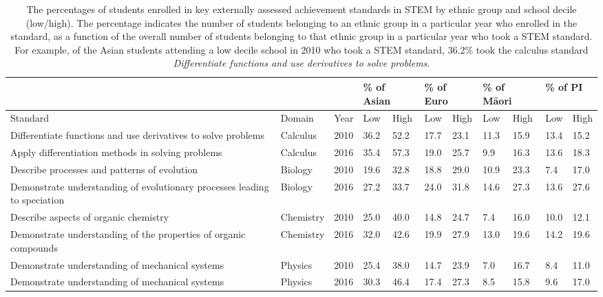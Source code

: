 \documentclass[a4paper]{article}
\begin{document}
\begin{landscape}
\begin{table}[h]
\begin{tabular}{lll|l|l|l|l|l|l|l|l|}
\cline{4-11}
          &&& \multicolumn{2}{l|}{\% of Asian} & \multicolumn{2}{l|}{\% of Euro} & \multicolumn{2}{l|}{\% of M\={a}ori}  & \multicolumn{2}{l|}{\% of PI} \\ \hline
\multicolumn{1}{|l|}{Standard} & \multicolumn{1}{l|}{Domain}  & Year & Low & High & Low & High & \multicolumn{1}{l|}{Low} & High & Low & High \\ \hline
\multicolumn{1}{|l|}{Differentiate functions and use derivatives to solve problems} & \multicolumn{1}{l|}{Calculus}  & 2010 & 36.2  & 52.2 & 17.7 & 23.1 & \multicolumn{1}{l|}{11.3} & 15.9 & 13.4 & 15.2 \\
\multicolumn{1}{|l|}{Apply differentiation methods in solving problems} & \multicolumn{1}{l|}{Calculus} & 2016 & 35.4 & 57.3 & 19.0 & 25.7 & \multicolumn{1}{l|}{9.9} & 16.3 & 13.6 & 18.3 \\ \hline
\multicolumn{1}{|l|}{Describe processes and patterns of evolution} & \multicolumn{1}{l|}{Biology} & 2010 & 19.6 & 32.8  & 18.8 & 29.0 & \multicolumn{1}{l|}{10.9} & 23.3 & 7.4 & 17.0 \\
\multicolumn{1}{|l|}{Demonstrate understanding of evolutionary processes leading to speciation} & \multicolumn{1}{l|}{Biology} & 2016 & 27.2 & 33.7 & 24.0 & 31.8 & \multicolumn{1}{l|}{14.6} & 27.3 & 13.6  & 27.6  \\ \hline
\multicolumn{1}{|l|}{Describe aspects of organic chemistry} & \multicolumn{1}{l|}{Chemistry} & 2010 & 25.0 & 40.0 & 14.8 & 24.7 & \multicolumn{1}{l|}{7.4} &16.0 & 10.0 & 12.1 \\
\multicolumn{1}{|l|}{Demonstrate understanding of the properties of organic compounds} & \multicolumn{1}{l|}{Chemistry} & 2016 & 32.0 &42.6 &19.9 &27.9 & \multicolumn{1}{l|}{13.0} & 19.6 &14.2 & 19.6 \\ \hline
\multicolumn{1}{|l|}{Demonstrate understanding of mechanical systems} & \multicolumn{1}{l|}{Physics} & 2010 & 25.4&38.0 &14.7 &23.9 & \multicolumn{1}{l|}{7.0} &16.7 & 8.4&11.0 \\
\multicolumn{1}{|l|}{Demonstrate understanding of mechanical systems} & \multicolumn{1}{l|}{Physics} & 2016 & 30.3&46.4 & 17.4& 27.3& \multicolumn{1}{l|}{8.5} &15.8 &9.6 &17.0 \\ \hline
\end{tabular}
\caption{The percentages of students enrolled in key externally assessed achievement standards in STEM by ethnic group and school decile (low/high). The percentage indicates the number of students belonging to an ethnic group in a particular year who enrolled in the standard, as a function of the overall number of students belonging to that ethnic group in a particular year who took a STEM standard. For example, of the Asian students attending a low decile school in 2010 who took a STEM standard, 36.2\% took the calculus standard \textit{Differentiate functions and use derivatives to solve problems}.  }  \label{table:StdattainmentEthnicityDecile}
\end{table}
\end{landscape}
\end{document}
